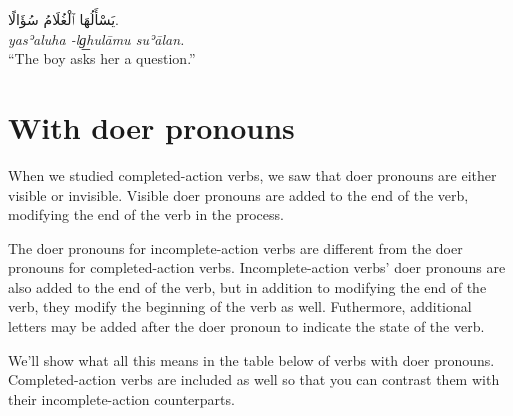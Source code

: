 \documentclass[
  10pt,
]{book}
\begin{document}
\foreignlanguage{arabic}{يَسْأَلُهَا ٱلْغُلَامُ سُؤَالًا.}\\
\emph{yasʾaluha -lg͟hulāmu suʾālan.}\\
\enquote{The boy asks her a question.}

\section{With doer pronouns}\label{with-doer-pronouns}

When we studied completed-action verbs, we saw that doer pronouns are either visible or invisible. Visible doer pronouns are added to the end of the verb, modifying the end of the verb in the process.

The doer pronouns for incomplete-action verbs are different from the doer pronouns for completed-action verbs.
Incomplete-action verbs' doer pronouns are also added to the end of the verb, but in addition to modifying the end of the verb, they modify the beginning of the verb as well. Futhermore, additional letters may be added after the doer pronoun to indicate the state of the verb.

We'll show what all this means in the table below of verbs with doer pronouns. Completed-action verbs are included as well so that you can contrast them with their incomplete-action counterparts.
\end{document}
